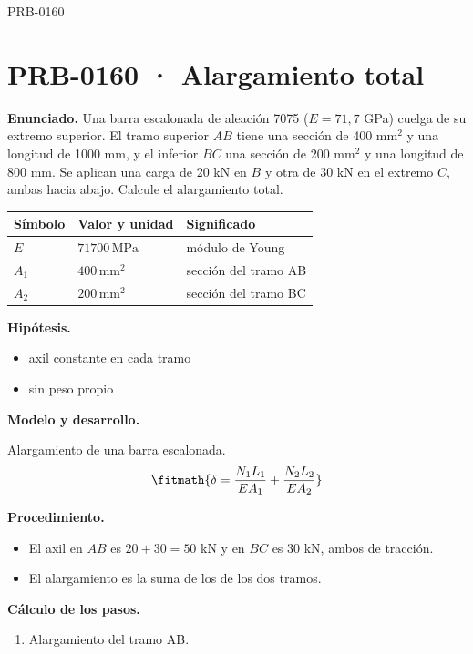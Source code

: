 \begin{studiumworked}{PRB-0160}

\section{PRB-0160 · Alargamiento total}

\textbf{Enunciado.} Una barra escalonada de aleación 7075 ($E = 71{,}7$ GPa) cuelga de su extremo superior. El tramo superior $AB$ tiene una sección de 400 mm$^2$ y una longitud de 1000 mm, y el inferior $BC$ una sección de 200 mm$^2$ y una longitud de 800 mm. Se aplican una carga de 20 kN en $B$ y otra de 30 kN en el extremo $C$, ambas hacia abajo. Calcule el alargamiento total.

\par\medskip\noindent\begin{tabular}{@{}p{.18\linewidth}p{.26\linewidth}p{.48\linewidth}@{}}
\toprule Símbolo & Valor y unidad & Significado\\\midrule
$E$ & $71700\,\mathrm{MPa}$ & módulo de Young\\
$A_{1}$ & $400\,\mathrm{mm^2}$ & sección del tramo AB\\
$A_{2}$ & $200\,\mathrm{mm^2}$ & sección del tramo BC\\
\bottomrule\end{tabular}\par\medskip

\textbf{Hipótesis.}\begin{itemize}\item axil constante en cada tramo
\item sin peso propio\end{itemize}

\textbf{Modelo y desarrollo.}

Alargamiento de una barra escalonada.\[\fitmath{\delta = \frac{N_1 L_1}{E A_1} + \frac{N_2 L_2}{E A_2}}\]

\textbf{Procedimiento.}\begin{itemize}\item El axil en $AB$ es $20 + 30 = 50$ kN y en $BC$ es $30$ kN, ambos de tracción.
\item El alargamiento es la suma de los de los dos tramos.\end{itemize}

\textbf{Cálculo de los pasos.}

\begin{enumerate}

\item Alargamiento del tramo AB.


\end{enumerate}
\end{studiumworked}
